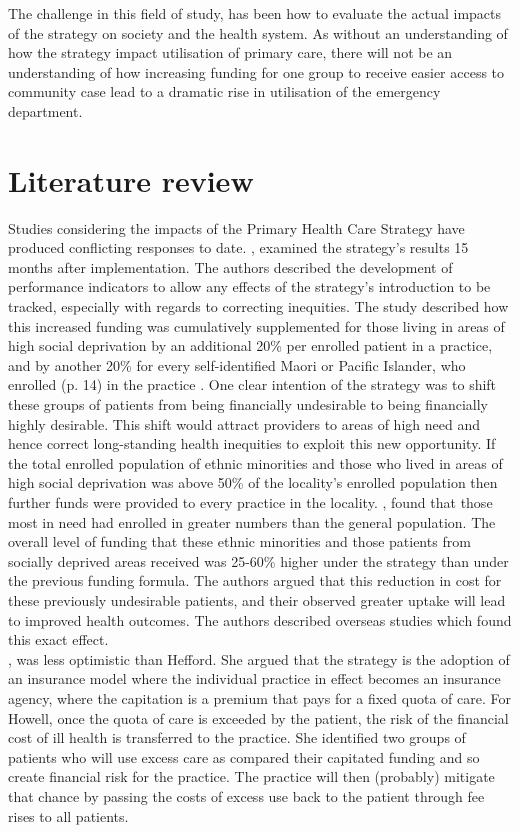 \documentclass[11pt,a4paper]{article}
\begin{document}
The challenge in this field of study, has been how to evaluate the actual impacts of the strategy on society and the health system. As without an understanding of how the strategy impact utilisation of primary care, there will not be an understanding of how increasing funding for one group to receive easier access to community case lead to a dramatic rise in utilisation of the emergency department.

\pagebreak
\section{Literature review}
Studies considering the impacts of the Primary Health Care Strategy have produced conflicting responses to date. \citet{hefford2005reducing}, examined the strategy's results 15 months after implementation. The authors described the development of performance indicators to allow any effects of the strategy's introduction to be tracked, especially with regards to correcting inequities. The study described  how this increased funding was cumulatively supplemented for those living in areas of high social deprivation by an additional 20\% per enrolled patient in a practice, and by another 20\% for every self-identified Maori or Pacific Islander, who enrolled (p. 14) in the practice \citep{hefford2005reducing}. One clear intention of the strategy was to shift these groups of patients from being financially undesirable to being financially highly desirable. This shift would attract providers to areas of high need and hence correct long-standing health inequities to exploit this new opportunity. If the total enrolled population of ethnic minorities and those who lived in areas of high social deprivation was above 50\% of the locality's enrolled population then further funds were provided to every practice in the locality. \citet{hefford2005reducing}, found that those most in need had enrolled in greater numbers than the general population. The overall level of funding that these ethnic minorities and those patients from socially deprived areas  received was 25-60\% higher under the strategy than under the previous funding formula. The authors argued that this reduction in cost for these previously undesirable patients, and their observed greater uptake will lead to improved health outcomes. The authors described overseas studies which found this exact effect.\\

\citet{howell2005restructuring}, was less optimistic than Hefford. She argued that the strategy is the adoption of an insurance model where the individual practice in effect becomes an insurance agency, where the capitation is a premium that pays for a fixed quota of care. For Howell, once the quota of care is exceeded by the patient, the risk of the financial cost of ill health is transferred to the practice. She identified two groups of patients who will use excess care as compared their capitated funding and so create financial risk for the practice. The practice will then (probably) mitigate that chance by passing the costs of excess use back to the patient through fee rises to all patients.\\
\end{document}
